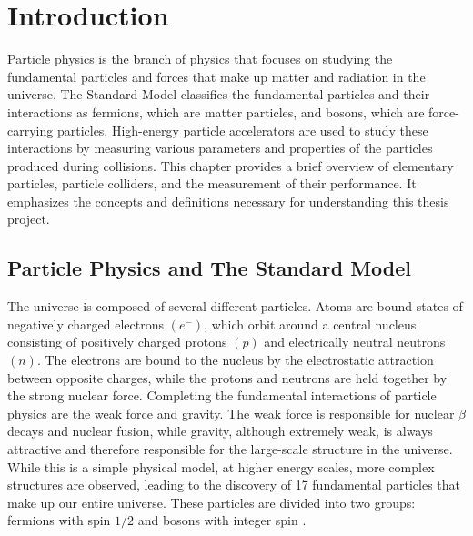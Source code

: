 \chapter{Introduction}
\label{ch1}

Particle physics is the branch of physics that focuses on studying the fundamental particles and forces that make up matter and radiation in the universe. The Standard Model classifies the fundamental particles and their interactions as fermions, which are matter particles, and bosons, which are force-carrying particles. High-energy particle accelerators are used to study these interactions by measuring various parameters and properties of the particles produced during collisions. This chapter provides a brief overview of elementary particles, particle colliders, and the measurement of their performance. It emphasizes the concepts and definitions necessary for understanding this thesis project.

\section{Particle Physics and The Standard Model}

The universe is composed of several different particles. Atoms are bound states of negatively charged electrons $(e^{-})$, which orbit around a central nucleus consisting of positively charged protons $(p)$ and electrically neutral neutrons $(n)$. The electrons are bound to the nucleus by the electrostatic attraction between opposite charges, while the protons and neutrons are held together by the strong nuclear force. Completing the fundamental interactions of particle physics are the weak force and gravity. The weak force is responsible for nuclear $\beta$ decays and nuclear fusion, while gravity, although extremely weak, is always attractive and therefore responsible for the large-scale structure in the universe.
While this is a simple physical model, at higher energy scales, more complex structures are observed, leading to the discovery of 17 fundamental particles that make up our entire universe. These particles are divided into two groups: fermions with spin $1/2$ and bosons with integer spin \cite{thomson_2013}.\\

